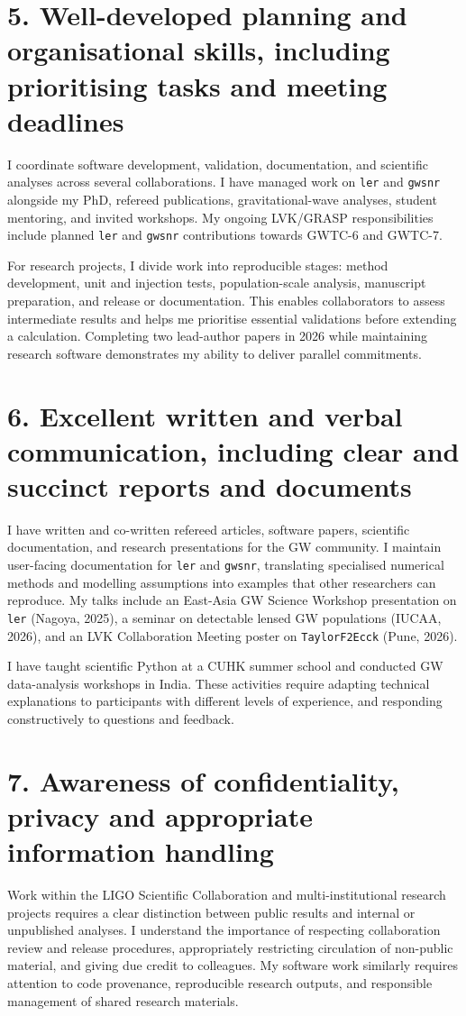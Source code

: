 \documentclass[10pt]{article}
\begin{document}
\newpage
\section*{5. Well-developed planning and organisational skills, including prioritising tasks and meeting deadlines}
I coordinate software development, validation, documentation, and scientific analyses across several collaborations. I have managed work on \texttt{ler} and \texttt{gwsnr} alongside my PhD, refereed publications, gravitational-wave analyses, student mentoring, and invited workshops. My ongoing LVK/GRASP responsibilities include planned \texttt{ler} and \texttt{gwsnr} contributions towards GWTC-6 and GWTC-7.

For research projects, I divide work into reproducible stages: method development, unit and injection tests, population-scale analysis, manuscript preparation, and release or documentation. This enables collaborators to assess intermediate results and helps me prioritise essential validations before extending a calculation. Completing two lead-author papers in 2026 while maintaining research software demonstrates my ability to deliver parallel commitments.

\section*{6. Excellent written and verbal communication, including clear and succinct reports and documents}
I have written and co-written refereed articles, software papers, scientific documentation, and research presentations for the GW community. I maintain user-facing documentation for \texttt{ler} and \texttt{gwsnr}, translating specialised numerical methods and modelling assumptions into examples that other researchers can reproduce. My talks include an East-Asia GW Science Workshop presentation on \texttt{ler} (Nagoya, 2025), a seminar on detectable lensed GW populations (IUCAA, 2026), and an LVK Collaboration Meeting poster on \texttt{TaylorF2Ecck} (Pune, 2026).

I have taught scientific Python at a CUHK summer school and conducted GW data-analysis workshops in India. These activities require adapting technical explanations to participants with different levels of experience, and responding constructively to questions and feedback.

\section*{7. Awareness of confidentiality, privacy and appropriate information handling}
Work within the LIGO Scientific Collaboration and multi-institutional research projects requires a clear distinction between public results and internal or unpublished analyses. I understand the importance of respecting collaboration review and release procedures, appropriately restricting circulation of non-public material, and giving due credit to colleagues. My software work similarly requires attention to code provenance, reproducible research outputs, and responsible management of shared research materials.
\end{document}
